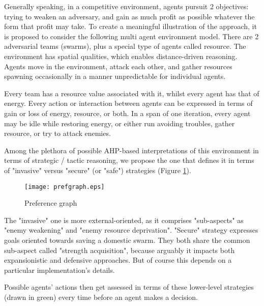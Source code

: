 Generally speaking, in a competitive environment, agents pursuit 2 objectives: trying to weaken an adversary, and gain
as much profit as possible whatever the form that profit may take. To create a meaningful illustration of the approach,
it is proposed to consider the following multi agent environment model. There are 2 adversarial teams (swarms), plus a
special type of agents called resource. The environment has spatial qualities, which enables distance-driven reasoning.
Agents move in the environment, attack each other, and gather resources spawning occasionally in a manner unpredictable
for individual agents.

Every team has a resource value associated with it, whilst every agent has that of energy. Every action or interaction
between agents can be expressed in terms of gain or loss of energy, resource, or both. In a span of one iteration, every
agent may be idle while restoring energy, or either run avoiding troubles, gather resource, or try to attack enemies.

Among the plethora of possible AHP-based interpretations of this environment in terms of strategic / tactic reasoning,
we propose the one that defines it in terms of "invasive" versus "secure" (or "safe") strategies (Figure
\ref{fig:df-models}).

\begin{figure}[hbt!]
    \centering
    \texttt{[image: prefgraph.eps]}

    \caption{\small Preference graph}
    \label{fig:df-models}
\end{figure}

The "invasive" one is more external-oriented, as it comprises "sub-aspects" as "enemy weakening" and "enemy resource
deprivation". "Secure" strategy expresses goals oriented towards saving a domestic swarm. They both share the common
sub-aspect called "strength acquisition", because arguably it impacts both expansionistic and defensive approaches. But
of course this depends on a particular implementation's details.

Possible agents' actions then get assessed in terms of these lower-level strategies (drawn in green) every time before
an agent makes a decision.